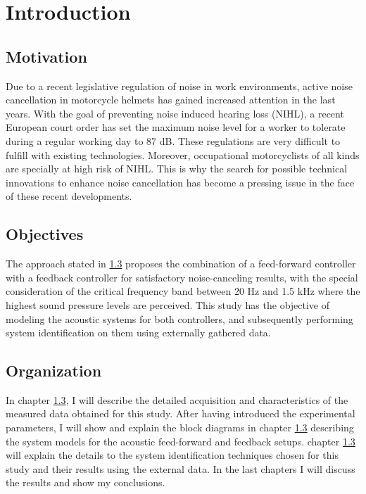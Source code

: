 


\chapter{Introduction}

\section{Motivation}
Due to a recent legislative regulation of noise in work environments, active noise cancellation in motorcycle helmets has gained increased attention in the last years. With the goal of preventing noise induced hearing loss (NIHL), a recent European court order has set the maximum noise level for a worker to tolerate during a regular working day to 87 dB. These regulations are very difficult to fulfill with existing technologies. Moreover, occupational motorcyclists of all kinds are specially at high risk of NIHL. This is why the search for possible technical innovations to enhance noise cancellation has become a pressing issue in the face of these recent developments. 

\section{Objectives}

The approach stated in \ref{} proposes the combination of a feed-forward controller with a feedback controller for satisfactory noise-canceling results, with the special consideration of the critical frequency band between 20 Hz and 1.5 kHz where the highest sound pressure levels are perceived. This study has the objective of modeling the acoustic systems for both controllers, and subsequently performing system identification on them using externally gathered data.

\section{Organization}

In chapter \ref{}, I will describe the detailed acquisition and characteristics of the measured data obtained for this study. After having introduced the experimental parameters, I will show and explain the block diagrams in chapter \ref{} describing the system models for the acoustic feed-forward and feedback setups. chapter \ref{} will explain the details to the system identification techniques chosen for this study and their results using the external data. In the last chapters I will discuss the results and show my conclusions.


